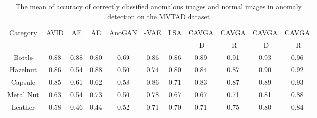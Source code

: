 \documentclass[runningheads]{llncs}
\begin{document}
\begin{table}[h]
\begin{center}
\renewcommand{\arraystretch}{.9}
\setlength{\tabcolsep}{2.0pt}
\caption{The mean of accuracy of correctly classified anomalous images and normal images in anomaly detection on the MVTAD dataset }
\label{table_accu_mvtec}

\scriptsize
\begin{tabular}{ccccccccccc}
\toprule
		Category &AVID  &AE  &AE &AnoGAN  &-VAE  &LSA  &CAVGA &CAVGA &CAVGA &CAVGA\\
		& \cite{sabokrou2018avid} & \cite{bergmann2018improving} &\cite{bergmann2018improving} & \cite{schlegl2017unsupervised} &\cite{dehaene2020iterative} &\cite{abati2019latent}     &-D &-R &-D &-R\\
\midrule
		Bottle &\cellcolor{blue!40}0.88    &\cellcolor{blue!40}0.88  &\cellcolor{blue!20}0.80 &\cellcolor{blue!10}0.69 &\cellcolor{blue!30}0.86 &\cellcolor{blue!30}0.86 &\cellcolor{blue!50}0.89 &\cellcolor{blue!60}0.91 &\cellcolor{blue!70}0.93 &\cellcolor{blue!80}\color{white}0.96\\

		Hazelnut &\cellcolor{blue!40}0.86 &\cellcolor{blue!15}0.54  &\cellcolor{blue!60}0.88 &\cellcolor{blue!10}0.50 &\cellcolor{blue!20}0.74 &\cellcolor{blue!25}0.80   &\cellcolor{blue!30}0.84  &\cellcolor{blue!50}0.87  &\cellcolor{blue!70}0.90 &\cellcolor{blue!80}\color{white}0.92\\
		          
		Capsule  &\cellcolor{blue!40}0.85 &\cellcolor{blue!15}0.61  &\cellcolor{blue!20}0.62 &\cellcolor{blue!10}0.58 &\cellcolor{blue!50}0.86 &\cellcolor{blue!25}0.71  &\cellcolor{blue!30}0.83 &\cellcolor{blue!60}0.87  &\cellcolor{blue!70}0.89 &\cellcolor{blue!80}\color{white}0.93\\
		          
		Metal Nut &\cellcolor{blue!20}0.63 &\cellcolor{blue!5}0.54  &\cellcolor{blue!50}0.73 &\cellcolor{blue!0}0.50 &\cellcolor{blue!60}0.78 &\cellcolor{blue!30}0.67  &\cellcolor{blue!30}0.67 &\cellcolor{blue!40}0.71   &\cellcolor{blue!70}0.81 &\cellcolor{blue!80}\color{white}0.88\\
		          
		Leather  &\cellcolor{blue!30}0.58 &\cellcolor{blue!20}0.46  &\cellcolor{blue!5}0.44 &\cellcolor{blue!15}0.52 &\cellcolor{blue!50}0.71 &\cellcolor{blue!40}0.70   &\cellcolor{blue!50}0.71 &\cellcolor{blue!60}0.75  &\cellcolor{blue!70}0.80 &\cellcolor{blue!80}\color{white}0.84\\
		          

\end{tabular}
\end{center}
\end{table}
\end{document}
